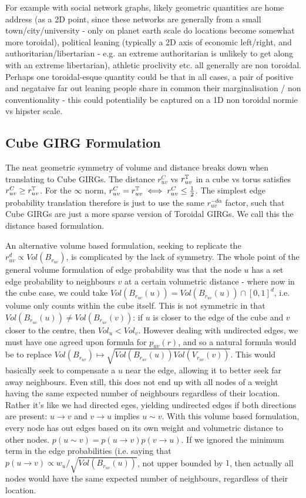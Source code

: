 For example with social network graphs, likely geometric quantities are home address (as a 2D point, since these networks are generally from a small town/city/university - only on planet earth scale do locations become somewhat more toroidal), political leaning (typically a 2D axis of economic left/right, and authoritarian/libertarian - e.g. an extreme authoritarian is unlikely to get along with an extreme libertarian), athletic proclivity etc. all generally are non toroidal. Perhaps one toroidal-esque quantity could be that in all cases, a pair of positive and negataive far out leaning people share in common their marginalisation / non conventionality - this could potentialily be captured on a 1D non toroidal normie vs hipster scale.  

\subsection{Cube GIRG Formulation}
The neat geometric symmetry of volume and distance breaks down when translating to Cube GIRGs. The distance $r_{uv}^C$ vs $r_{uv}^{\mathbb{T}}$ in a cube vs torus satisfies $r_{uv}^C \geq r_{uv}^{\mathbb{T}}$. For the $\infty$ norm, $r_{uv}^C = r_{uv}^{\mathbb{T}} \iff r_{uv}^C \leq \frac{1}{2}$. The simplest edge probability translation therefore is just to use the same $r_{uv}^{-d \alpha}$ factor, such that Cube GIRGs are just a more sparse version of Toroidal GIRGs. We call this the distance based formulation. 

An alternative volume based formulation, seeking to replicate the $r_{uv}^d \propto Vol(B_{r_{uv}})$, is complicated by the lack of symmetry. The whole point of the general volume formulation of edge probability was that the node $u$ has a set edge probability to neighbours $v$ at a certain volumetric distance - where now in the cube case, we could take $Vol(B_{r_{uv}}(u)) = Vol(B_{r_{uv}}(u)) \cap [0, 1]^d$, i.e. volume only counts within the cube itself. This is not symmetric in that $Vol(B_{r_{uv}}(u)) \neq Vol(B_{r_{uv}}(v))$: if $u$ is closer to the edge of the cube and $v$ closer to the centre, then $Vol_u < Vol_v$. However dealing with undirected edges, we must have one agreed upon formula for $p_{uv}(r)$, and so a natural formula would be to replace $Vol(B_{r_{uv}}) \mapsto \sqrt{Vol(B_{r_{uv}}(u)) Vol(V_{r_{uv}}(v))}$. This would basically seek to compensate a $u$ near the edge, allowing it to better seek far away neighbours. Even still, this does not end up with all nodes of a weight having the same expected number of neighbours regardless of their location. Rather it's like we had directed eges, yielding undirected edges if both directions are present: $u \to v$ and $v \to u$ implies $u \sim v$. With this volume based formulation, every node has out edges based on its own weight and volumetric distance to other nodes. $p(u \sim v) = p(u \to v) p(v \to u)$. If we ignored the minimum term in the edge probabilities (i.e. saying that $p(u \to v) \propto w_u / \sqrt{Vol(B_{r_{uv}}(u))}$, not upper bounded by $1$, then actually all nodes would have the same expected number of neighbours, regardless of their location.

